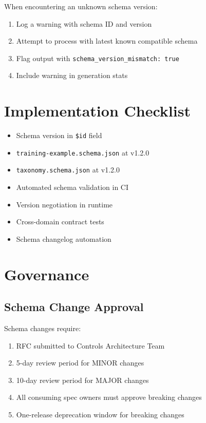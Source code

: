 When encountering an unknown schema version:

\begin{enumerate}
  \item Log a warning with schema ID and version
  \item Attempt to process with latest known compatible schema
  \item Flag output with \texttt{schema\_version\_mismatch: true}
  \item Include warning in generation stats
\end{enumerate}

\section{Implementation Checklist}

\begin{itemize}
  \item[\texttt{[x]}] Schema version in \texttt{\$id} field
  \item[\texttt{[x]}] \texttt{training-example.schema.json} at v1.2.0
  \item[\texttt{[x]}] \texttt{taxonomy.schema.json} at v1.2.0
  \item[\texttt{[ ]}] Automated schema validation in CI
  \item[\texttt{[ ]}] Version negotiation in runtime
  \item[\texttt{[ ]}] Cross-domain contract tests
  \item[\texttt{[ ]}] Schema changelog automation
\end{itemize}

\section{Governance}

\subsection{Schema Change Approval}

Schema changes require:

\begin{enumerate}
  \item RFC submitted to Controls Architecture Team
  \item 5-day review period for MINOR changes
  \item 10-day review period for MAJOR changes
  \item All consuming spec owners must approve breaking changes
  \item One-release deprecation window for breaking changes
\end{enumerate}


